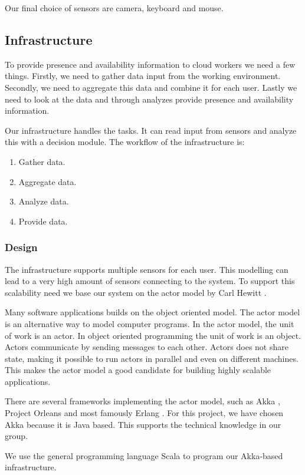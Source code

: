 \documentclass{sigchi}
\begin{document}
Our final choice of sensors are camera, keyboard and mouse.

\subsection{Infrastructure}
To provide presence and availability information to cloud workers we need a few things.
Firstly, we need to gather data input from the working environment.
Secondly, we need to aggregate this data and combine it for each user. Lastly we need to look at the data and through analyzes provide presence and availability information.

Our infrastructure handles the tasks. It can read input from sensors and analyze this with a decision module.
The workflow of the infrastructure is:

\begin{enumerate}
  \item Gather data.
  \item Aggregate data.
  \item Analyze data.
  \item Provide data.
\end{enumerate}

\subsubsection{Design}
The infrastructure supports multiple sensors for each user.
This modelling can lead to a very high amount of sensors connecting to the system.
To support this scalability need we base our system on the actor model by Carl Hewitt \cite{hewitt1973universal}.

Many software applications builds on the object oriented model.
The actor model is an alternative way to model computer programs.
In the actor model, the unit of work is an actor.
In object oriented programming the unit of work is an object.
Actors communicate by sending messages to each other.
Actors does not share state, making it possible to run actors in parallel and even on different machines.
This makes the actor model a good candidate for building highly scalable applications.

There are several frameworks implementing the actor model, such as Akka \cite{akka}, Project Orleans \cite{orleans} and most famously Erlang \cite{erlang}.
For this project, we have chosen Akka because it is Java based.
This supports the technical knowledge in our group.

We use the general programming language Scala \cite{scala} to program our Akka-based infrastructure.
\end{document}
